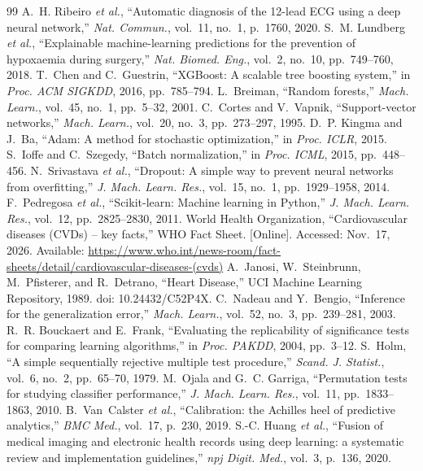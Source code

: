 \begin{thebibliography}{99}
 A.~H. Ribeiro \emph{et al.}, ``Automatic diagnosis of the 12-lead ECG using a deep neural network,'' \emph{Nat. Commun.}, vol.~11, no.~1, p.~1760, 2020.
 S.~M. Lundberg \emph{et al.}, ``Explainable machine-learning predictions for the prevention of hypoxaemia during surgery,'' \emph{Nat. Biomed. Eng.}, vol.~2, no.~10, pp.~749--760, 2018.
 T.~Chen and C.~Guestrin, ``XGBoost: A scalable tree boosting system,'' in \emph{Proc. ACM SIGKDD}, 2016, pp.~785--794.
 L.~Breiman, ``Random forests,'' \emph{Mach. Learn.}, vol.~45, no.~1, pp.~5--32, 2001.
 C.~Cortes and V.~Vapnik, ``Support-vector networks,'' \emph{Mach. Learn.}, vol.~20, no.~3, pp.~273--297, 1995.
 D.~P. Kingma and J.~Ba, ``Adam: A method for stochastic optimization,'' in \emph{Proc. ICLR}, 2015.
 S.~Ioffe and C.~Szegedy, ``Batch normalization,'' in \emph{Proc. ICML}, 2015, pp.~448--456.
 N.~Srivastava \emph{et al.}, ``Dropout: A simple way to prevent neural networks from overfitting,'' \emph{J. Mach. Learn. Res.}, vol.~15, no.~1, pp.~1929--1958, 2014.
 F.~Pedregosa \emph{et al.}, ``Scikit-learn: Machine learning in Python,'' \emph{J. Mach. Learn. Res.}, vol.~12, pp.~2825--2830, 2011.
 World Health Organization, ``Cardiovascular diseases (CVDs) -- key facts,'' WHO Fact Sheet. [Online]. Accessed: Nov.~17, 2026. Available: \url{https://www.who.int/news-room/fact-sheets/detail/cardiovascular-diseases-(cvds)}
 A.~Janosi, W.~Steinbrunn, M.~Pfisterer, and R.~Detrano, ``Heart Disease,'' UCI Machine Learning Repository, 1989. doi: 10.24432/C52P4X.
 C.~Nadeau and Y.~Bengio, ``Inference for the generalization error,'' \emph{Mach. Learn.}, vol.~52, no.~3, pp.~239--281, 2003.
 R.~R. Bouckaert and E.~Frank, ``Evaluating the replicability of significance tests for comparing learning algorithms,'' in \emph{Proc. PAKDD}, 2004, pp.~3--12.
 S.~Holm, ``A simple sequentially rejective multiple test procedure,'' \emph{Scand. J. Statist.}, vol.~6, no.~2, pp.~65--70, 1979.
 M.~Ojala and G.~C. Garriga, ``Permutation tests for studying classifier performance,'' \emph{J. Mach. Learn. Res.}, vol.~11, pp.~1833--1863, 2010.
 B.~Van~Calster \emph{et al.}, ``Calibration: the Achilles heel of predictive analytics,'' \emph{BMC Med.}, vol.~17, p.~230, 2019.
 S.-C. Huang \emph{et al.}, ``Fusion of medical imaging and electronic health records using deep learning: a systematic review and implementation guidelines,'' \emph{npj Digit. Med.}, vol.~3, p.~136, 2020.

\end{thebibliography}
